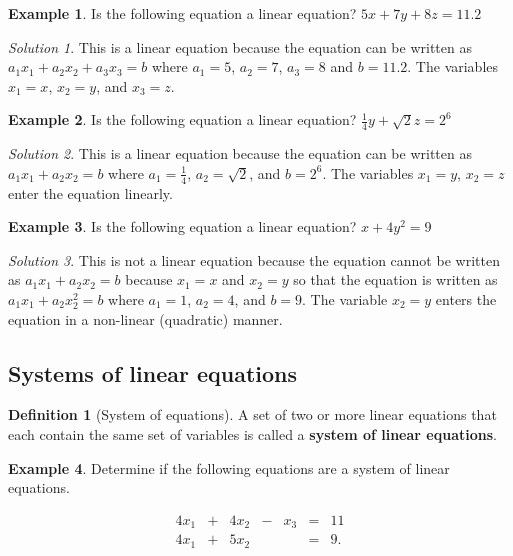 \documentclass[
]{book}
\theoremstyle{definition}
\newtheorem{definition}{Definition}[chapter]
\theoremstyle{definition}
\newtheorem{example}{Example}[chapter]
\theoremstyle{definition}
\theoremstyle{definition}
\theoremstyle{remark}
\newtheorem*{solution}{Solution}
\begin{document}
\begin{example}
Is the following equation a linear equation?
\(5x + 7y + 8z = 11.2\)
\end{example}

\begin{solution}
This is a linear equation because the equation can be written as \(a_1 x_1 + a_2 x_2 + a_3 x_3= b\) where \(a_1 = 5\), \(a_2 = 7\), \(a_3 = 8\) and \(b = 11.2\). The variables \(x_1 = x\), \(x_2 = y\), and \(x_3 = z\).
\end{solution}

\begin{example}
Is the following equation a linear equation?
\(\frac{1}{4} y + \sqrt{2} z = 2^6\)
\end{example}

\begin{solution}
This is a linear equation because the equation can be written as \(a_1 x_1 + a_2 x_2 = b\) where \(a_1 = \frac{1}{4}\), \(a_2 = \sqrt{2}\), and \(b = 2^6\). The variables \(x_1 = y\), \(x_2 = z\) enter the equation linearly.
\end{solution}

\begin{example}
Is the following equation a linear equation?
\(x + 4 y^2 = 9\)
\end{example}

\begin{solution}
This is not a linear equation because the equation cannot be written as \(a_1 x_1 + a_2 x_2 = b\) because \(x_1 = x\) and \(x_2 = y\) so that the equation is written as \(a_1 x_1 + a_2 x_2^2 = b\) where \(a_1 = 1\), \(a_2 = 4\), and \(b = 9\). The variable \(x_2 = y\) enters the equation in a non-linear (quadratic) manner.
\end{solution}

\hypertarget{systems-of-linear-equations}{%
\subsection{Systems of linear equations}\label{systems-of-linear-equations}}

\begin{definition}[System of equations]
A set of two or more linear equations that each contain the same set of variables is called a \textbf{system of linear equations}.
\end{definition}

\begin{example}
Determine if the following equations are a system of linear equations.

\begin{alignat*}{4}
x_1   & {}+{} & 4 x_2 & {}-{} & x_3 & {}={} & 11 \\
4 x_1 & {}+{} & 5 x_2 & {}{} &     & {}={} & 9.
\end{alignat*}
\end{example}
\end{document}
